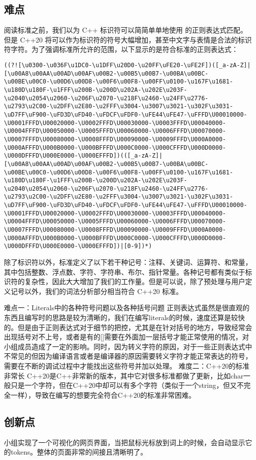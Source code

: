 \subsection{难点}

阅读标准之前，我们以为 C++ 标识符可以简简单单地使用 \code{[_a-zA-Z][_a-zA-Z0-9]*} 的正则表达式匹配。但是 C++20 将可以作为标识符的符号大幅增加，甚至中文字与表情是合法的标识符字符。为了强调标准所允许的范围，以下显示的是符合标准的正则表达式：

\begin{lstlisting}[basicstyle=\ttfamily\tiny]
((?![\u0300-\u036F\u1DC0-\u1DFF\u20D0-\u20FF\uFE20-\uFE2F])([_a-zA-Z]|[\u00A8\u00AA\u00AD\u00AF\u00B2-\u00B5\u00B7-\u00BA\u00BC-\u00BE\u00C0-\u00D6\u00D8-\u00F6\u00F8-\u00FF\u0100-\u167F\u1681-\u180D\u180F-\u1FFF\u200B-\u200D\u202A-\u202E\u203F-\u2040\u2054\u2060-\u206F\u2070-\u218F\u2460-\u24FF\u2776-\u2793\u2C00-\u2DFF\u2E80-\u2FFF\u3004-\u3007\u3021-\u302F\u3031-\uD7FF\uF900-\uFD3D\uFD40-\uFDCF\uFDF0-\uFE44\uFE47-\uFFFD\U00010000-\U0001FFFD\U00020000-\U0002FFFD\U00030000-\U0003FFFD\U00040000-\U0004FFFD\U00050000-\U0005FFFD\U00060000-\U0006FFFD\U00070000-\U0007FFFD\U00080000-\U0008FFFD\U00090000-\U0009FFFD\U000A0000-\U000AFFFD\U000B0000-\U000BFFFD\U000C0000-\U000CFFFD\U000D0000-\U000DFFFD\U000E0000-\U000EFFFD])(([_a-zA-Z]|[\u00A8\u00AA\u00AD\u00AF\u00B2-\u00B5\u00B7-\u00BA\u00BC-\u00BE\u00C0-\u00D6\u00D8-\u00F6\u00F8-\u00FF\u0100-\u167F\u1681-\u180D\u180F-\u1FFF\u200B-\u200D\u202A-\u202E\u203F-\u2040\u2054\u2060-\u206F\u2070-\u218F\u2460-\u24FF\u2776-\u2793\u2C00-\u2DFF\u2E80-\u2FFF\u3004-\u3007\u3021-\u302F\u3031-\uD7FF\uF900-\uFD3D\uFD40-\uFDCF\uFDF0-\uFE44\uFE47-\uFFFD\U00010000-\U0001FFFD\U00020000-\U0002FFFD\U00030000-\U0003FFFD\U00040000-\U0004FFFD\U00050000-\U0005FFFD\U00060000-\U0006FFFD\U00070000-\U0007FFFD\U00080000-\U0008FFFD\U00090000-\U0009FFFD\U000A0000-\U000AFFFD\U000B0000-\U000BFFFD\U000C0000-\U000CFFFD\U000D0000-\U000DFFFD\U000E0000-\U000EFFFD])|[0-9])*)
\end{lstlisting}

除了标识符以外，标准定义了以下若干种记号：注释、关键词、运算符、和常量，其中包括整数、浮点数、字符、字符串、布尔、指针常量。各种记号都有类似于标识符的复杂性，因此大大增加了我们的工作量。但是可以说，除了预处理与用户定义记号以外，我们的词法分析部分相当符合 C++20 标准。


难点一：Literals中的各种符号问题以及各种括号问题
正则表达式虽然是很直观的东西且编写时的思路是较为清晰的，我们在编写literals的时候，速度还算是较快的。但是由于正则表达式对于细节的把控，尤其是在针对括号的地方，导致经常会出现括号对不上号，或者是有的[]需要在外面加一层括号才能正常使用的情况，对小组成员造成了一定的影响。同时，因为转义字符的原因，对于一些正则表达式中不常见的但因为编译语言或者是编译器的原因需要转义字符才能正常表达的符号，需要在不断的调试过程中才能找出这些符号并加以处理。
	难度二：C++20的标准非常长
C++20是C++非常新的版本，其中它对很多标准都做了更新，比如char一般只是一个字符，但在C++20中却可以有多个字符（类似于一个string，但又不完全一样），导致在编写的想要完全符合C++20的标准非常困难。

\subsection{创新点}

小组实现了一个可视化的网页界面，当把鼠标光标放到词上的时候，会自动显示它的tokens。整体的页面非常的间接且清晰明了。